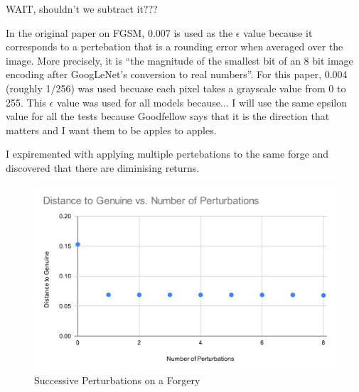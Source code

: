 WAIT, shouldn't we subtract it???

In the original paper on FGSM, 0.007 is used as the $\epsilon$ value because it corresponds to a pertebation that is a rounding error when averaged over the image.
More precisely, it is ``the magnitude of the smallest bit of an 8 bit image encoding after GoogLeNet's conversion to real numbers''\cite{goodfellow}.
For this paper, 0.004 (roughly 1/256) was used becuase each pixel takes a grayscale value from 0 to 255.
This $\epsilon$ value was used for all models because...
I will use the same epsilon value for all the tests because Goodfellow says that it is the direction that matters and I want them to be apples to apples.

I expiremented with applying multiple pertebations to the same forge and discovered that there are diminising returns.
\begin{figure}[h]
    \begin{center}
        \includegraphics[width=0.8\linewidth]{dist_pert_plot.png}
    \end{center}
    \caption{Successive Perturbations on a Forgery}
    \label{fig:siamese}
\end{figure}


